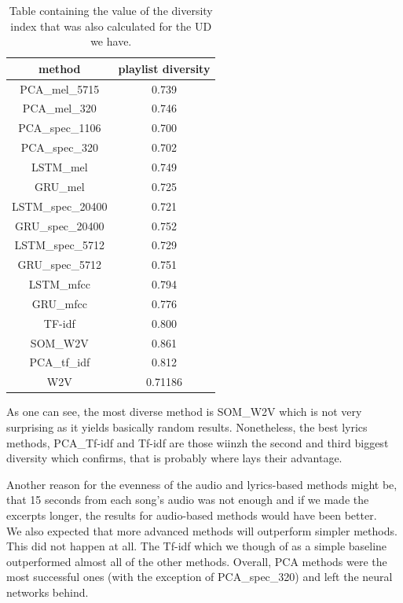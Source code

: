 \begin{table}[h]
\centering

\begin{tabu} to 1.7\textwidth {| c | c |}
\hline
\textbf{method} & \textbf{playlist diversity} \\
\hline
PCA\_mel\_5715 & 0.739 \\
\hline
PCA\_mel\_320 & 0.746 \\
\hline
PCA\_spec\_1106 & 0.700 \\
\hline
PCA\_spec\_320 & 0.702 \\
\hline
LSTM\_mel & 0.749 \\
\hline
GRU\_mel & 0.725 \\
\hline
LSTM\_spec\_20400 & 0.721 \\
\hline
GRU\_spec\_20400 &  0.752\\
\hline
LSTM\_spec\_5712 & 0.729 \\
\hline
GRU\_spec\_5712 &  0.751 \\
\hline
LSTM\_mfcc & 0.794 \\
\hline
GRU\_mfcc & 0.776 \\
\hline
TF-idf & 0.800 \\
\hline
SOM\_W2V & 0.861 \\
\hline
PCA\_tf\_idf & 0.812 \\
\hline
W2V & 0.71186 \\
\hline
\end{tabu} 
\caption{Table containing the value of the diversity index that was also calculated for the UD we have.}
\label{table:diversity_table}
\end{table}
As one can see, the most diverse method is SOM\_W2V which is not very surprising as it yields basically random results. Nonetheless, the best lyrics methods, PCA\_Tf-idf and Tf-idf are those wiinzh the second and third biggest diversity which confirms, that is probably where lays their advantage.

Another reason for the evenness of the audio and lyrics-based methods might be, that 15 seconds from each song's audio was not enough and if we made the excerpts longer, the results for audio-based methods would have been better. \\

We also expected that more advanced methods will outperform simpler methods. This did not happen at all. The Tf-idf which we though of as a simple baseline outperformed almost all of the other methods. Overall, PCA methods were the most successful ones (with the exception of PCA\_spec\_320) and left the neural networks behind. 

